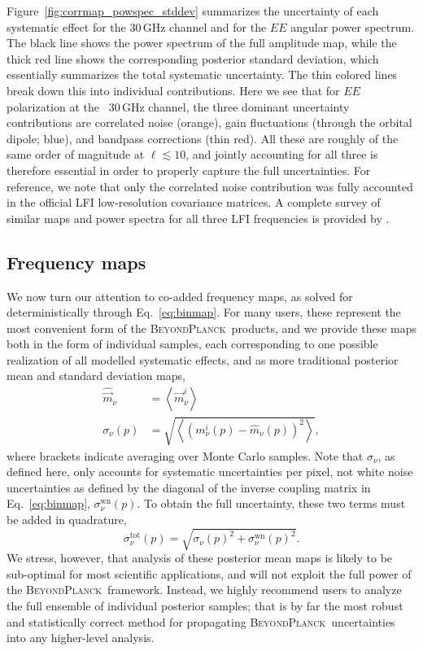 \documentclass[twocolumn]{aa}
\newcommand{\m}[0]{\vec{m}}
\newcommand{\BP}{\textsc{BeyondPlanck}}
\begin{document}
Figure~\ref{fig:corrmap_powspec_stddev} summarizes the uncertainty of
each systematic effect for the 30\,GHz channel and for the $EE$
angular power spectrum. The black line shows the power spectrum of the
full amplitude map, while the thick red line shows the corresponding
posterior standard deviation, which essentially summarizes the total
systematic uncertainty. The thin colored lines break down this into
individual contributions. Here we see that for $EE$ polarization at
the \Planck\ 30\,GHz channel, the three dominant uncertainty
contributions are correlated noise (orange), gain fluctuations
(through the orbital dipole; blue), and bandpass corrections (thin
red). All these are roughly of the same order of magnitude at
$\ell\lesssim10$, and jointly accounting for all three is therefore
essential in order to properly capture the full uncertainties. For
reference, we note that only the correlated noise contribution was
fully accounted in the official LFI low-resolution covariance
matrices. A complete survey of similar maps and power spectra for all
three LFI frequencies is provided by \citet{bp10}.

\subsection{Frequency maps}
\label{sec:freqmaps}


We now turn our attention to co-added frequency maps, as solved for
deterministically through Eq.~\eqref{eq:binmap}. For many users, these
represent the most convenient form of the \BP\ products, and we
provide these maps both in the form of individual samples, each
corresponding to one possible realization of all modelled systematic
effects, and as more traditional posterior mean and standard deviation
maps,
\begin{align}
  \hat{\m}_{\nu} &= \left<\m_{\nu}^i \right>\\
  \sigma_{\nu}(p) &= \sqrt{\left<\left(m_{\nu}^i(p)-\hat{m}_{\nu}(p)\right)^2 \right>},
\end{align}
where brackets indicate averaging over Monte Carlo samples. Note that
$\sigma_{\nu}$, as defined here, only accounts for systematic uncertainties
per pixel, not white noise uncertainties as defined by the diagonal of
the inverse coupling matrix in Eq.~\eqref{eq:binmap},
$\sigma_{\nu}^{\mathrm{wn}}(p)$. To obtain the full uncertainty, these
two terms must be added in quadrature,
\begin{equation}
  \sigma_{\nu}^{\mathrm{tot}}(p) = \sqrt{\sigma_{\nu}(p)^2 + \sigma_{\nu}^{\mathrm{wn}}(p)^2}.
\end{equation}
We stress, however, that analysis of these posterior mean maps is
likely to be sub-optimal for most scientific applications, and will
not exploit the full power of the \BP\ framework. Instead, we highly
recommend users to analyze the full ensemble of individual posterior
samples; that is by far the most robust and statistically correct
method for propagating \BP\ uncertainties into any higher-level
analysis.
\end{document}
